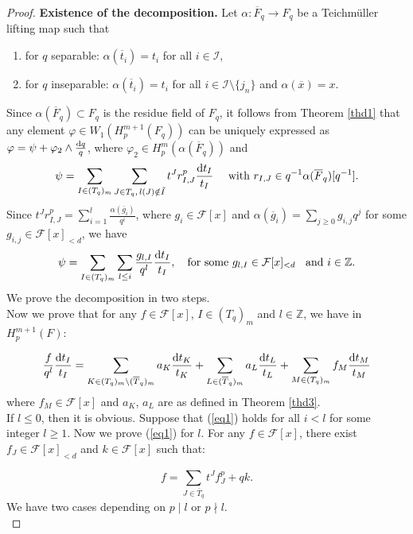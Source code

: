 \documentclass[times,10pt]{amsart}
\newcommand{\Z}{\ensuremath{\mathbb{Z}}}
\newcommand{\dd}{{\rm d}}
\newcommand{\F}{\ensuremath{\mathcal{F}}}
\newcommand{\I}{\ensuremath{\mathcal{I}}}
\renewcommand{\phi}{\varphi}
\begin{document}
\begin{proof}
    \textbf{Existence of the decomposition.} Let $\alpha: \overline{F}_q\xrightarrow{} F_q$   be a Teichm\"uller lifting map such that \begin{enumerate}
        \item  for $q$ separable: $ \alpha(\overline{t}_i)=t_i$ for all $i\in \I$,
        \item for $q$ inseparable: $ \alpha(\overline{ t}_i)= t_i$ for all $ i\in \I\setminus \{j_n\}$ and $\alpha(\overline{x})=x$. 
    \end{enumerate}
     Since $ \alpha(\overline{F}_q)\subset F_q$ is the residue field of $F_q$, it follows from Theorem \ref{thd1} that   any  element $ \phi\in W_1(H_p^{m+1}(F_q))$ can be    uniquely  expressed as $ \phi= \psi+ \phi_2\wedge \frac{\dd q}{q}$, where $\phi_2\in H_p^m(\alpha(\overline{F}_q))$ and  $$\psi= \sum\limits_{I\in (T_q)_m}\sum\limits_{J\in T_q, \,l(J)\notin \tilde{I}}   t^J r^p_{I,J}  \frac{\dd t_I}{t_I}\quad \text{ with $ r_{I,J}\in q^{-1}\alpha( \overline{F}_q)[q^{-1}]$}. $$  Since $  t^J r^p_{I,J}= \sum\limits_{i=1}^{l} \frac{\alpha( \overline{g}_i)}{q^i}$, where   $g_i\in \F[x]$ and $ \alpha(\overline{g}_i)= \sum_{j\geq 0}g_{i,j}q^j$  for some $g_{i,j}\in \F[x]_{<d}$, we have $$  \psi= \sum_{I\in (T_q)_m}\sum_{l\leq i} \frac{g_{l,I}}{q^l}\frac{\dd t_I}{t_I}, \quad \text{for some }  g_{l,I}\in \F[x]_{<d} \hspace{2mm} \text{ and } i\in \Z .$$
We prove the decomposition in two steps.\\

  Now we prove that  for any $ f\in \F[x]$, $I\in (T_q)_m$ and $l\in \Z$, we have in $  H_p^{m+1}(F)$:

 \begin{equation}\label{eq1}
     \frac{f}{q^l}\frac{\dd t_I}{t_I}= \sum_{K\in (T_q)_m\setminus (\overline{T}_q)_m}a_K \frac{\dd t_K}{t_K}+\sum_{L\in (\overline{T}_q)_m}a_L \frac{\dd t_L}{t_L}+ \sum_{M\in (T_q)_m} f_M \frac{\dd t_M}{t_M}\end{equation}where $f_M\in \F[x]$ and $a_K$, $a_L$  are as defined in Theorem \ref{thd3}.   \\

 If $l\leq 0$, then it is obvious.  Suppose {that} (\ref{eq1}) holds for all  $i<l$ for some  integer  $l\geq 1$. Now we prove (\ref{eq1}) for $l$.  For any $f\in \F[x]$,  there exist $f_J\in \F[x]_{<d}$ and $ k\in \F[x]$ such that:

  \begin{equation}\label{eq2}
       f=\sum_{J\in \overline{T}_q} t^J f^p_J+qk.\end{equation}  We have  two cases depending on {$p\mid l$} or $p\nmid l $.\\


\end{proof}
\end{document}
